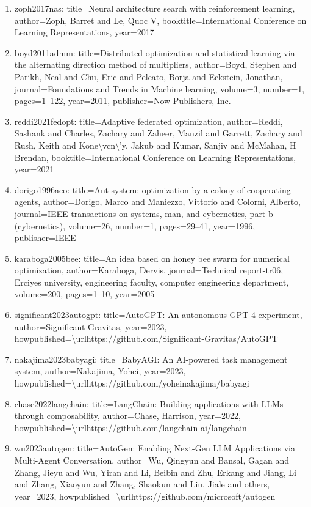 \documentclass[11pt]{article}
\begin{document}
\begin{enumerate}[leftmargin=*]
  \item zoph2017nas: title=Neural architecture search with reinforcement learning, author=Zoph, Barret and Le, Quoc V, booktitle=International Conference on Learning Representations, year=2017
  \item boyd2011admm: title=Distributed optimization and statistical learning via the alternating direction method of multipliers, author=Boyd, Stephen and Parikh, Neal and Chu, Eric and Peleato, Borja and Eckstein, Jonathan, journal=Foundations and Trends in Machine learning, volume=3, number=1, pages=1--122, year=2011, publisher=Now Publishers, Inc.
  \item reddi2021fedopt: title=Adaptive federated optimization, author=Reddi, Sashank and Charles, Zachary and Zaheer, Manzil and Garrett, Zachary and Rush, Keith and Kone\textbackslash{}vcn\textbackslash{}'y, Jakub and Kumar, Sanjiv and McMahan, H Brendan, booktitle=International Conference on Learning Representations, year=2021
  \item dorigo1996aco: title=Ant system: optimization by a colony of cooperating agents, author=Dorigo, Marco and Maniezzo, Vittorio and Colorni, Alberto, journal=IEEE transactions on systems, man, and cybernetics, part b (cybernetics), volume=26, number=1, pages=29--41, year=1996, publisher=IEEE
  \item karaboga2005bee: title=An idea based on honey bee swarm for numerical optimization, author=Karaboga, Dervis, journal=Technical report-tr06, Erciyes university, engineering faculty, computer engineering department, volume=200, pages=1--10, year=2005
  \item significant2023autogpt: title=AutoGPT: An autonomous GPT-4 experiment, author=Significant Gravitas, year=2023, howpublished=\textbackslash{}urlhttps://github.com/Significant-Gravitas/AutoGPT
  \item nakajima2023babyagi: title=BabyAGI: An AI-powered task management system, author=Nakajima, Yohei, year=2023, howpublished=\textbackslash{}urlhttps://github.com/yoheinakajima/babyagi
  \item chase2022langchain: title=LangChain: Building applications with LLMs through composability, author=Chase, Harrison, year=2022, howpublished=\textbackslash{}urlhttps://github.com/langchain-ai/langchain
  \item wu2023autogen: title=AutoGen: Enabling Next-Gen LLM Applications via Multi-Agent Conversation, author=Wu, Qingyun and Bansal, Gagan and Zhang, Jieyu and Wu, Yiran and Li, Beibin and Zhu, Erkang and Jiang, Li and Zhang, Xiaoyun and Zhang, Shaokun and Liu, Jiale and others, year=2023, howpublished=\textbackslash{}urlhttps://github.com/microsoft/autogen

\end{enumerate}
\end{document}
